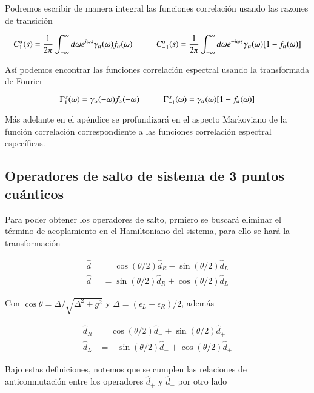 \begin{appendixs}
Podremos escribir de manera integral las funciones correlación usando las razones de transición

\begin{equation*}
    C_{1}^{\alpha}(s) = \frac{1}{2\pi} \int_{-\infty}^{\infty}d\omega e^{i\omega s} \gamma_{\alpha}(\omega) f_{\alpha}(\omega)  \hspace{10mm} C_{-1}^{\alpha}(s) = \frac{1}{2\pi} \int_{-\infty}^{\infty}d\omega e^{-i\omega s} \gamma_{\alpha}(\omega) [1-f_{\alpha}(\omega)]
\end{equation*}

Así podemos encontrar las funciones correlación espectral usando la transformada de Fourier

\begin{equation*}
    \Gamma_{1}^{\alpha}(\omega) = \gamma_{\alpha}(-\omega)f_{\alpha}(-\omega)  \hspace{10mm} \Gamma_{-1}^{\alpha}(\omega) = \gamma_{\alpha}(\omega)[1-f_{\alpha}(\omega)]
\end{equation*}

Más adelante en el apéndice se profundizará en el aspecto Markoviano de la función correlación correspondiente a las funciones correlación espectral específicas.
\label{apendix5bathcorre}

\subsection{ Operadores de salto de sistema de 3 puntos cuánticos}
Para poder obtener los operadores de salto, prmiero se buscará eliminar el término de acoplamiento en el Hamiltoniano del sistema, para ello se hará la transformación

\begin{align*}
    \hat{d}_{-} & = \cos(\theta/2)\hat{d}_{R} - \sin(\theta/2)\hat{d}_{L} \\
    \hat{d}_{+} & = \sin(\theta/2)\hat{d}_{R} + \cos(\theta/2)\hat{d}_{L}
\end{align*}


Con $\cos \theta = \Delta/\sqrt{ \Delta^{2} + g^{2} }$ y $\Delta = (\epsilon_{L} - \epsilon_{R})/2$, además  

\begin{align*}
    \hat{d}_{R} & = \cos(\theta/2)\hat{d}_{-} + \sin(\theta/2)\hat{d}_{+} \\
    \hat{d}_{L} & = -\sin(\theta/2)\hat{d}_{-} + \cos(\theta/2)\hat{d}_{+}
\end{align*}

Bajo estas definiciones, notemos que se cumplen las relaciones de anticonmutación entre los operadores $\hat{d}_{+}$ y $\hat{d}_{-}$ por otro lado


\end{appendixs}
